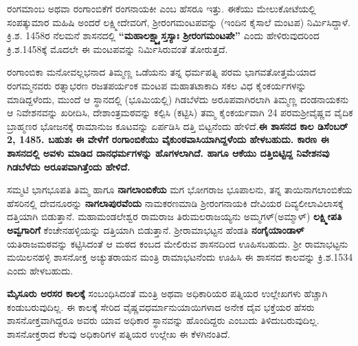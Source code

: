 \vskip 2pt

ರಂಗಮಾಂಬ ಅಥವಾ ರಂಗಾಂಬಿಕೆಗೆ ರಂಗನಾಯಕೀ ಎಂಬ ಹೆಸರೂ ಇತ್ತು. ಈಕೆಯು ಮೇಲುಕೋಟೆಯಲ್ಲಿ ಸಂಪತ್ಕುಮಾರ ಮಹಿಷಿ ಅಂದರೆ ಲಕ್ಷ್ಮೀದೇವರಿಗೆ, ಶ‍್ರೀರಂಗಮಂಟಪವನ್ನು (ಇಂದಿನ ಕೈಸಾಲೆ ಮಂಟಪ) ನಿರ್ಮಿಸಿದ್ದಾಳೆ. ಕ್ರಿ.ಶ. 1458ರ ನೆಲಮನೆ ಶಾಸನದಲ್ಲಿ \textbf{“ಮಹಾಲಕ್ಷ್ಮ್ಯಾಸ್ತಸ್ಯಾಃ ಶ‍್ರೀರಂಗಮಂಟಪೇ”} ಎಂದು ಹೇಳಿರುವುದರಿಂದ ಕ್ರಿ.ಶ.1458ಕ್ಕೆ ಮೊದಲೇ ಈ ಮಂಟಪವನ್ನು ನಿರ್ಮಿಸಿರುವಂತೆ ತೋರುತ್ತದೆ.

\vskip 2pt

ರಂಗಾಂಬಿಕಾ ಮನೋವಲ್ಲಭನಾದ ತಿಮ್ಮಣ್ಣ ಒಡೆಯನು ತನ್ನ ಧರ್ಮಪತ್ನಿ ಪರಮ ಭಾಗವತೋತ್ತಮೆಯಾದ ರಂಗಮ್ಮನವರು ರತ್ನಾಭರಣ ರಜತಪರ್ಯಂಕ ಮಂಟಪ ಮಹಾತಟಾಕಾದಿ ಸಕಲ ವಿಧ ಕೈಂಕರ್ಯಗಳನ್ನು ಮಾಡಿದ್ದಳೆಂದು, ಮುಂದೆ ಆ ಸ್ಥಾನದಲ್ಲಿ (ಭೂಮಿಯಲ್ಲಿ) ಗಿಡಬೆಳೆದು ಅರೂಪವಾಗಿರಲಾಗಿ ತಿಮ್ಮಣ್ಣ ದಂಡನಾಯಕನು ಆ ನಿವೇಶನವನ್ನು ಖರೀದಿಸಿ, ದೇಶಾಂತ್ರಮಠವನ್ನು ಕಲ್ಪಿಸಿ (ಕಟ್ಟಿಸಿ) ತಮ್ಮ ಕೈಂಕರ್ಯವಾಗಿ 24 ಪರಮಶ‍್ರೀವೈಷ್ಣವ ವೈದಿಕ ಬ್ರಾಹ್ಮಣರ ಭೋಜನಕ್ಕೆ ರಾಮಾನುಜ ಕೂಟವನ್ನು ಏರ್ಪಡಿಸಿ ದತ್ತಿ ಬಿಟ್ಟನೆಂದು ಹೇಳಿದೆ.\textbf{ಈ ಶಾಸನದ ಕಾಲ ಡಿಸೆಂಬರ್​ 2, 1485. ಬಹುಶಃ ಈ ವೇಳೆಗೆ ರಂಗಾಂಬಿಕೆಯು ವೈಕುಂಠವಾಸಿಯಾಗಿದ್ದಳೆಂದು ಹೇಳಬಹುದು. ಕಾರಣ ಈ ಶಾಸನದಲ್ಲಿ ಅವಳು ಮಾಡಿದ ದಾನಧರ್ಮಗಳನ್ನು ಹೊಗಳಲಾಗಿದೆ. ಹಾಗೂ ಆಕೆಯು ದತ್ತಿಬಿಟ್ಟಿದ್ದ ನಿವೇಶನವು ಗಿಡಬೆಳೆದು ಅರೂಪವಾಗಿತ್ತೆಂದು ಹೇಳಿದೆ.}

\vskip 2pt

ಸಮ್ಮಟಿ ಭಾಗಭೂಪತಿ ತಿಮ್ಮ ಹಾಗೂ \textbf{ನಾಗಲಾಂಬಿಕೆಯ} ಮಗ ಭೋಗರಾಜ ಭೂಪಾಲನು, ತನ್ನ ತಾಯಿ\break ನಾಗಲಾಂಬಿಕೆಯ ಹೆಸರಿನಲ್ಲಿ ದೇವನೂರನ್ನು \textbf{ನಾಗಲಾಪುರವೆಂದು} ನಾಮಕರಣಮಾಡಿ ಶ‍್ರೀರಂಗನಾಯಕಿ ದೇವಿಯರ ದಿವ್ಯಲೀಲಾವಿಲಾಸಕ್ಕೆ ದತ್ತಿಯಾಗಿ ಬಿಡುತ್ತಾನೆ. ಮಹಾಮಂಡಲೇಶ್ವರ ರಾಮರಾಜ ತಿರುಮಲರಾಜಯ್ಯನು ಅಮ್ಮಗಳ್​\break (ಅಮ್ಮಾಳ್​) \textbf{ಲಕ್ಷ್ಮೀಪತಿ ಅವ್ವಗಾರಿಗೆ} ಕೆಂಚೇನಹಳ್ಳಿಯನ್ನು ದತ್ತಿಯಾಗಿ ಬಿಡುತ್ತಾನೆ. ಶ‍್ರೀರಾಮಾಭಟ್ಟನ ಹೆಂಡತಿ \textbf{ನಂಗೈಯಾಂಡಾಳ್​} ಯತಿರಾಜಮಠವನ್ನು ಕಟ್ಟಿಸಿದಂತೆ ಆ ಮಠದ ಕಂಬದ ಮೇಲಿರುವ ಶಾಸನದಿಂದ ಊಹಿಸಬಹುದು. ಶ‍್ರೀ ರಾಮಾಭಟ್ಟನು ಮಯಿಲನಹಳ್ಳಿ ಶಾಸನೋಕ್ತ ಅಚ್ಯುತರಾಯನ ಮಂತ್ರಿ ರಾಮಾಭಟನೆಂದು ಊಹಿಸಿ ಈ ಶಾಸನದ ಕಾಲವನ್ನು ಕ್ರಿ.ಶ.1534 ಎಂದು ಹೇಳಬಹುದು.

\textbf{ಮೈಸೂರು ಅರಸರ ಕಾಲಕ್ಕೆ} ಸಂಬಂಧಿಸಿದಂತೆ ಮಂತ್ರಿ ಅಥವಾ ಅಧಿಕಾರಿಯರ ಪತ್ನಿಯರ ಉಲ್ಲೇಖಗಳು ಹೆಚ್ಚಾಗಿ ಕಂಡುಬರುವುದಿಲ್ಲ. ಈ ಕಾಲಕ್ಕೆ ಸೇರಿದ ವೈಷ್ಣವಧರ್ಮಾನುಯಾಯಿಗಳಾದ ಅನೇಕ ದೈವ ಭಕ್ತೆಯರ ಹೆಸರು ಶಾಸನೋಕ್ತ\-ವಾಗಿದ್ದರೂ ಅವರು ಯಾವ ಅಧಿಕಾರ ಸ್ಥಾನವನ್ನು ಹೊಂದಿದ್ದರು ಎಂಬುದು ತಿಳಿದುಬರುವುದಿಲ್ಲ. ಶಾಸನೋಕ್ತರಾದ ಕೆಲವು ಅಧಿಕಾರಿಗಳ ಪತ್ನಿಯರ ಉಲ್ಲೇಖ ಈ ಕೆಳಗಿನಂತಿದೆ.

